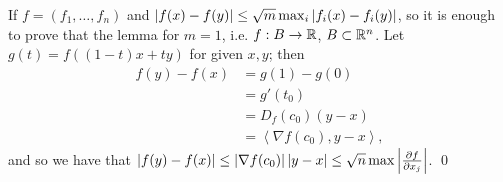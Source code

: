 \noindent If $f = (f_1, \dots, f_n)$ and $\left\lvert f(x) - f(y) \right\rvert \leq \sqrt{m} \max_i \left\lvert f_i(x) - f_i(y) \right\rvert$, so it is enough to prove that the lemma for $m = 1$, i.e. $f : B \to \mathbb R$, $B \subset \mathbb R^n$. Let $g(t) = f((1 - t)x + ty)$ for given $x, y$; then
\begin{align*}
    f(y) - f(x) &= g(1) - g(0) \\
    &= g'(t_0) \tag{for some $t_0 \in (0, 1)$ by MVT} \\
    &= D_f(c_0)(y - x) \tag{where $c_0 = (1 - t_0)x + t_0y$} \\
    &= \left<\nabla f(c_0), y - x\right>,
\end{align*}
and so we have that $\left\lvert f(y) - f(x) \right\rvert \leq \left\lvert \nabla f(c_0) \right\rvert \left\lvert y - x \right\rvert \leq \sqrt{n} \max \left\lvert \frac{\partial f}{\partial x_j} \right\rvert$. \qed